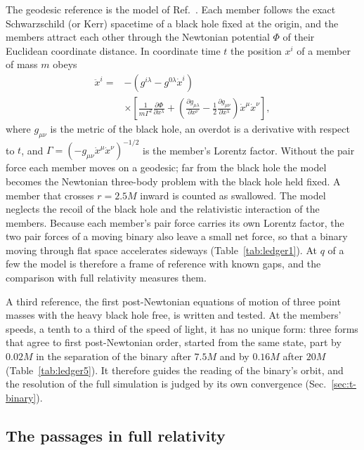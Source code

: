 \documentclass[aps,prd,twocolumn,10pt,superscriptaddress,nofootinbib,longbibliography,floatfix]{revtex4-2}
\begin{document}
The geodesic reference is the model of Ref.~\cite{Manzaneda:2024geodesic}. Each member follows the exact Schwarzschild (or Kerr) spacetime of a black hole fixed at the origin, and the members attract each other through the Newtonian potential $\Phi$ of their Euclidean coordinate distance. In coordinate time $t$ the position $x^i$ of a member of mass $m$ obeys
\begin{equation}\label{eq:geodesic}
\begin{split}
\ddot{x}^i=&-\left(g^{i\lambda}-g^{0\lambda}\dot{x}^i\right)\\
&\times\left[\frac{1}{m\Gamma^2}\frac{\partial\Phi}{\partial x^\lambda}
+\left(\frac{\partial g_{\mu\lambda}}{\partial x^\nu}-\frac{1}{2}\frac{\partial g_{\mu\nu}}{\partial x^\lambda}\right)\dot{x}^\mu\dot{x}^\nu\right],
\end{split}
\end{equation}
where $g_{\mu\nu}$ is the metric of the black hole, an overdot is a derivative with respect to $t$, and $\Gamma=(-g_{\mu\nu}\dot{x}^\mu\dot{x}^\nu)^{-1/2}$ is the member's Lorentz factor. Without the pair force each member moves on a geodesic; far from the black hole the model becomes the Newtonian three-body problem with the black hole held fixed. A member that crosses $r=2.5M$ inward is counted as swallowed. The model neglects the recoil of the black hole and the relativistic interaction of the members. Because each member's pair force carries its own Lorentz factor, the two pair forces of a moving binary also leave a small net force, so that a binary moving through flat space accelerates sideways (Table~\ref{tab:ledger1}). At $q$ of a few the model is therefore a frame of reference with known gaps, and the comparison with full relativity measures them.

A third reference, the first post-Newtonian equations of motion of three point masses with the heavy black hole free, is written and tested. At the members' speeds, a tenth to a third of the speed of light, it has no unique form: three forms that agree to first post-Newtonian order, started from the same state, part by $0.02M$ in the separation of the binary after $7.5M$ and by $0.16M$ after $20M$ (Table~\ref{tab:ledger5}). It therefore guides the reading of the binary's orbit, and the resolution of the full simulation is judged by its own convergence (Sec.~\ref{sec:t-binary}).

\subsection{The passages in full relativity}\label{sec:nr}
\end{document}
